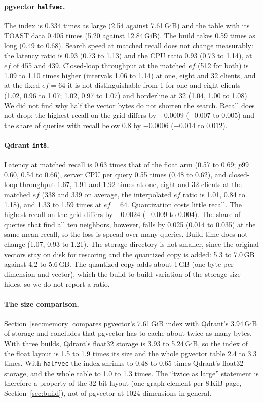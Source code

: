 \documentclass[preprint,12pt]{elsarticle}
\begin{document}
\paragraph{pgvector \texttt{halfvec}.} The index is 0.334 times as large (2.54 against 7.61\,GiB)
and the table with its TOAST data 0.405 times (5.20 against 12.84\,GiB). The build takes 0.59
times as long (0.49 to 0.68). Search speed at matched recall does not change measurably: the
latency ratio is 0.93 (0.73 to 1.13) and the CPU ratio 0.93 (0.73 to 1.14), at $ef$ of 455 and 439. Closed-loop throughput at the
matched $ef$ (512 for both) is 1.09 to 1.10 times higher (intervals 1.06 to 1.14) at one, eight and 32 clients, and
at the fixed $ef=64$ it is not distinguishable from 1 for one and eight clients (1.02, 0.96 to 1.07; 1.02, 0.97 to 1.07) and borderline at 32 (1.04, 1.00 to 1.08).
We did not find
why half the vector bytes do not shorten the search. Recall does not drop: the highest recall on
the grid differs by $-0.0009$ ($-0.007$ to $0.005$) and the share of queries with recall below 0.8 by
$-0.0006$ ($-0.014$ to $0.012$).

\paragraph{Qdrant \texttt{int8}.} Latency at matched recall is 0.63 times that of the float
arm (0.57 to 0.69; $p99$ 0.60, 0.54 to 0.66), server CPU per query 0.55 times (0.48 to 0.62), and closed-loop throughput 1.67, 1.91 and 1.92
times at one, eight and 32 clients at the matched $ef$ (338 and 339 on average, the
interpolated $ef$ ratio is 1.01, 0.84 to 1.18), and 1.33 to 1.59 times at $ef=64$. Quantization costs
little recall. The highest recall on the grid differs by $-0.0024$ ($-0.009$ to $0.004$). The share
of queries that find all ten neighbors, however, falls by 0.025 (0.014 to 0.035) at the same mean
recall, so the loss is spread over many queries. Build time does not change (1.07, 0.93 to 1.21). The
storage directory is not smaller, since the original vectors stay on disk for rescoring and the
quantized copy is added: 5.3 to 7.0\,GB against 4.2 to 5.6\,GB. The quantized copy adds about
1\,GB (one byte per dimension and vector), which the build-to-build variation of the storage size hides,
so we do not report a ratio.

\paragraph{The size comparison.} Section~\ref{sec:memory} compares pgvector's 7.61\,GiB index with
Qdrant's 3.94\,GiB of storage and concludes that pgvector has to cache about twice as many bytes. With three
builds, Qdrant's float32 storage is 3.93 to 5.24\,GiB, so the index of the float layout is 1.5 to 1.9
times its size and the whole pgvector table 2.4 to 3.3 times. With \texttt{halfvec} the index shrinks to 0.48 to 0.65
times Qdrant's float32 storage, and the whole table to 1.0 to 1.3 times. The ``twice as large'' statement is therefore a
property of the 32-bit layout (one graph element per 8\,KiB page, Section~\ref{sec:build}), not of
pgvector at 1024 dimensions in general.
\end{document}
